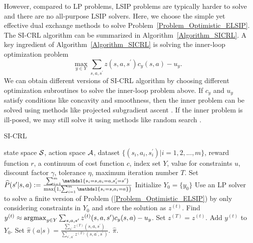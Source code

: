 However, compared to LP problems, LSIP problems are typically harder to solve and there are no all-purpose LSIP solvers.
Here, we choose the simple yet effective dual exchange methods \citep{Hu1990,reemtsen1998numerical} to solve Problem~\ref{Problem_Optimistic_ELSIP}.
The SI-CRL algorithm can be summarized in Algorithm~\ref{Algorithm_SICRL}.
A key ingredient of Algorithm~\ref{Algorithm_SICRL} is solving the inner-loop optimization problem 
$$
\max_{y\in Y} \sum_{s, a,s^\prime}z(s,a,s^\prime)c_y(s,a)-u_y.
$$
We can obtain different versions of SI-CRL algorithm by choosing different optimization subroutines to solve the inner-loop problem above. 
If $c_y$ and $u_y$ satisfy conditions like concavity and smoothness, then the inner problem can be solved using methods like projected subgradient ascent \citep{bubeck2015convex}.
If the inner problem is ill-posed, we may still solve it using methods like random search \citep{solis1981minimization, andradottir2015review}.
\begin{algorithm}[htb]
   \caption{SI-CRL}
   \label{Algorithm_SICRL}
\begin{algorithmic}
    state space ${\mathcal{S}}$, action space ${\mathcal{A}}$, dataset $\{(s_i,a_i,s_i^\prime)|i=1,2,...,m\}$, reward function $r$, a continuum of cost function $c$, index set $Y$, value for constraints $u$, discount factor $\gamma$, tolerance $\eta$, maximum iteration number $T$.
   \STATE Set $\widehat P(s^\prime|s,a):=\frac{\sum_{i=1}^m \ind\{s_i=s,a_i=a,s_i^\prime=s^\prime\}}{\max\paren{1,\sum_{i=1}^m \ind\{s_i=s,a_i=a\}}}$
   \ENDFOR
   \STATE Initialize $Y_0=\{y_0\}$
   \STATE Use an LP solver to solve a finite version of Problem (\ref{Problem_Optimistic_ELSIP}) by only considering constraints in $Y_0$ and store the solution as $z^{(t)}$.
   \STATE Find $y^{(t)}\approx\operatorname*{argmax}_{y\in Y} \sum_{s, a,s^\prime}z^{(t)}(s,a,s^\prime)c_y(s,a)-u_y$.
   \STATE  Set $z^{(T)}=z^{(t)}$.
   \ENDIF
   \STATE Add $y^{(t)}$ to $Y_0$.
   \ENDFOR
   \STATE Set $\hat\pi(a|s)=\frac{\sum_{s^\prime}z^{(T)}(s,a,s^\prime)}{\sum_{s^\prime,a^\prime}z^{(T)}(s,a^\prime,s^\prime)}$.
   \ENDFOR
    $\hat{\pi}$.
\end{algorithmic}
\end{algorithm}



